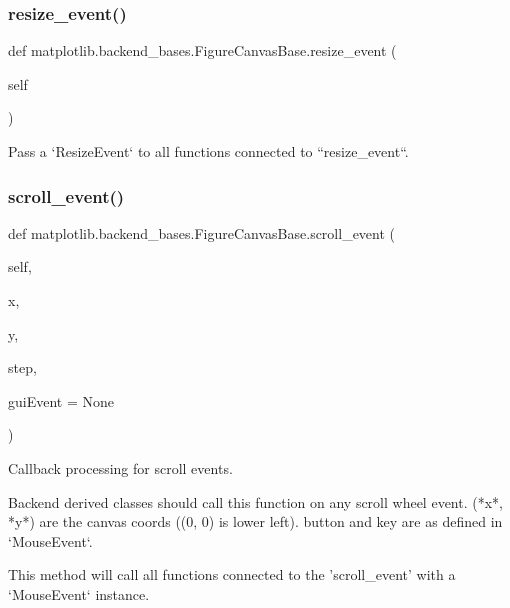 \subsubsection{\texorpdfstring{resize\+\_\+event()}{resize\_event()}}
{\footnotesize\ttfamily def matplotlib.\+backend\+\_\+bases.\+Figure\+Canvas\+Base.\+resize\+\_\+event (\begin{DoxyParamCaption}\item[{}]{self }\end{DoxyParamCaption})}

\begin{DoxyVerb}Pass a `ResizeEvent` to all functions connected to ``resize_event``.
\end{DoxyVerb}
 \mbox{\label{classmatplotlib_1_1backend__bases_1_1FigureCanvasBase_a4eb6feddcdf02352d4ee188465bd30ab}} 
\subsubsection{\texorpdfstring{scroll\+\_\+event()}{scroll\_event()}}
{\footnotesize\ttfamily def matplotlib.\+backend\+\_\+bases.\+Figure\+Canvas\+Base.\+scroll\+\_\+event (\begin{DoxyParamCaption}\item[{}]{self,  }\item[{}]{x,  }\item[{}]{y,  }\item[{}]{step,  }\item[{}]{gui\+Event = {\ttfamily None} }\end{DoxyParamCaption})}

\begin{DoxyVerb}Callback processing for scroll events.

Backend derived classes should call this function on any
scroll wheel event.  (*x*, *y*) are the canvas coords ((0, 0) is lower
left).  button and key are as defined in `MouseEvent`.

This method will call all functions connected to the 'scroll_event'
with a `MouseEvent` instance.
\end{DoxyVerb}
 \mbox{\label{classmatplotlib_1_1backend__bases_1_1FigureCanvasBase_ac8e6616b8dbdcf23cbc3dd3a6032fbb6}} 
